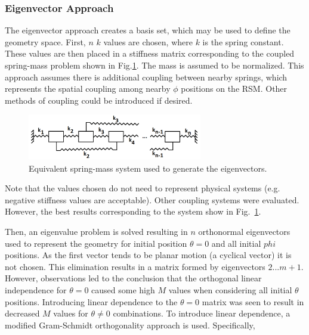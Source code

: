 \documentclass[3p,times]{elsarticle}
\begin{document}
\subsubsection{Eigenvector Approach}
The eigenvector approach creates a basis set, which may be used to define the geometry space.  
First, $n$ $k$ values are chosen, where $k$ is the spring constant.  
These values are then placed in a stiffness matrix corresponding to the coupled spring-mass problem shown in Fig.\ref{fig:stiff}.  
The mass is assumed to be normalized.  
This approach assumes there is additional coupling between nearby springs, which represents the spatial coupling among nearby $\phi$ positions on the RSM.
Other methods of coupling could be introduced if desired.

\begin{figure}[ht!]
\includegraphics[width={3.0in}]{../figs/MassSys.pdf}
\centering
\caption{Equivalent spring-mass system used to generate the eigenvectors.}
\label{fig:stiff}
\end{figure}

Note that the values chosen do not need to represent physical systems (e.g. negative stiffness values are acceptable).  
Other coupling systems were evaluated.  
However, the best results corresponding to the system show in Fig.~\ref{fig:stiff}.  

Then, an eigenvalue problem is solved resulting in $n$ orthonormal eigenvectors used to represent the geometry for initial position $\theta=0$ and all initial $phi$ positions.  
As the first vector tends to be planar motion (a cyclical vector) it is not chosen.  
This elimination results in a matrix formed by eigenvectors $2...m+1$.  
However, observations led to the conclusion that the orthogonal linear independence for $\theta=0$ caused some high $M$ values when considering all initial $\theta$ positions.  
Introducing linear dependence to the $\theta=0$ matrix was seen to result in decreased $M$ values for $\theta\neq 0$ combinations.  
To introduce linear dependence, a modified Gram-Schmidt orthogonality approach is used.  Specifically, 
\end{document}
